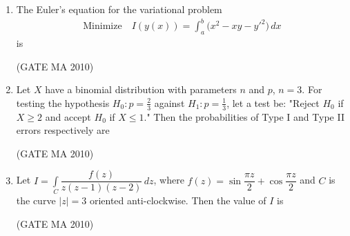 \documentclass[journal,12pt,onecolumn]{IEEEtran}
\theoremstyle{remark}
\begin{document}
\begin{flushleft}
\begin{enumerate}
\item The Euler's equation for the variational problem  
\begin{align*}
\text{Minimize}\quad I(y(x))=\int_{a}^{b}\big(x^{2}-xy-y'^{2}\big)\,dx
\end{align*}
is \underline{\hspace{2cm}}

\hfill(GATE MA 2010)

\begin{enumerate}
\end{enumerate}
\item Let $X$ have a binomial distribution with parameters $n$ and $p$, $n=3$. For testing the hypothesis $H_0\colon p=\tfrac{2}{3}$ against $H_1\colon p=\tfrac{1}{3}$, let a test be: "Reject $H_0$ if $X\geq 2$ and accept $H_0$ if $X\leq 1$." Then the probabilities of Type I and Type II errors respectively are \underline{\hspace{2cm}}

\hfill(GATE MA 2010)

\begin{enumerate}
\end{enumerate}

\item Let $I=\int\limits_{C}\dfrac{f(z)}{z(z-1)(z-2)}\,dz$, where $f(z)=\sin\dfrac{\pi z}{2}+\cos\dfrac{\pi z}{2}$ and $C$ is the curve $\lvert z\rvert=3$ oriented anti-clockwise. Then the value of $I$ is \underline{\hspace{2cm}}

\hfill(GATE MA 2010)

\begin{enumerate}
\end{enumerate}


\end{enumerate}
\end{flushleft}
\end{document}
